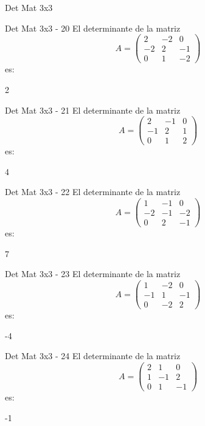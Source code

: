 \documentclass[a4,11pt]{aleph-notas}
\begin{document}
\begin{quiz}{Det Mat 3x3}
\begin{numerical}[tolerance=0]%
    {Det Mat 3x3 - 20}
    El determinante de la matriz
    \[
        A = \begin{pmatrix} 2 & -2 & 0 \\ -2 & 2 & -1 \\ 0 & 1 & -2 \end{pmatrix}
    \]
    es:
    \item[] 2
\end{numerical}

\begin{numerical}[tolerance=0]%
    {Det Mat 3x3 - 21}
    El determinante de la matriz
    \[
        A = \begin{pmatrix} 2 & -1 & 0 \\ -1 & 2 & 1 \\ 0 & 1 & 2 \end{pmatrix}
    \]
    es:
    \item[] 4
\end{numerical}

\begin{numerical}[tolerance=0]%
    {Det Mat 3x3 - 22}
    El determinante de la matriz
    \[
        A = \begin{pmatrix} 1 & -1 & 0 \\ -2 & -1 & -2 \\ 0 & 2 & -1 \end{pmatrix}
    \]
    es:
    \item[] 7
\end{numerical}

\begin{numerical}[tolerance=0]%
    {Det Mat 3x3 - 23}
    El determinante de la matriz
    \[
        A = \begin{pmatrix} 1 & -2 & 0 \\ -1 & 1 & -1 \\ 0 & -2 & 2 \end{pmatrix}
    \]
    es:
    \item[] -4
\end{numerical}

\begin{numerical}[tolerance=0]%
    {Det Mat 3x3 - 24}
    El determinante de la matriz
    \[
        A = \begin{pmatrix} 2 & 1 & 0 \\ 1 & -1 & 2 \\ 0 & 1 & -1 \end{pmatrix}
    \]
    es:
    \item[] -1
\end{numerical}


\end{quiz}
\end{document}
